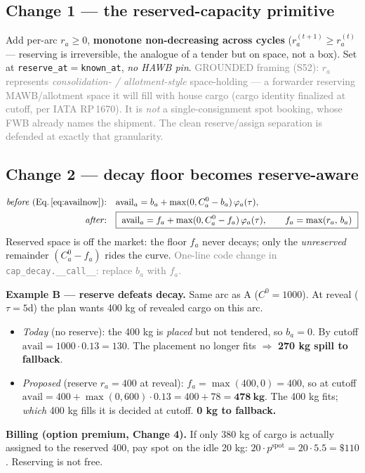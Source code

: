 \documentclass[11pt]{article}
\newcommand{\resv}{r}
\newcommand{\Cz}{C^{0}}
\newcommand{\avail}{\mathrm{avail}}
\newcommand{\code}[1]{\texttt{#1}}
\newcommand{\note}[1]{\textcolor{gray}{\small #1}}
\begin{document}
\subsection{Change 1 --- the reserved-capacity primitive}
Add per-arc $\resv_a\ge0$, \textbf{monotone non-decreasing across cycles}
($\resv_a^{(t+1)}\ge \resv_a^{(t)}$ --- reserving is irreversible, the analogue of a tender but on
space, not a box). Set at \code{reserve\_at}${}={}$\code{known\_at}, \emph{no HAWB pin}.
\note{GROUNDED framing (S52): $\resv_a$ represents \emph{consolidation- / allotment-style} space-holding
--- a forwarder reserving MAWB/allotment space it will fill with house cargo (cargo identity finalized at
cutoff, per IATA RP\,1670). It is \emph{not} a single-consignment spot booking, whose FWB already names
the shipment. The clean reserve/assign separation is defended at exactly that granularity.}

\subsection{Change 2 --- decay floor becomes reserve-aware}
\begin{align}
\text{\emph{before} (Eq.\,\ref{eq:availnow}):}\quad & \avail_a=b_a+\max(0,\Cz_a-b_a)\,\varphi_a(\tau),\\
\text{\emph{after}:}\quad & \boxed{\ \avail_a=f_a+\max(0,\Cz_a-f_a)\,\varphi_a(\tau),\qquad f_a=\max(\resv_a,\,b_a)\ }\label{eq:availnew}
\end{align}
Reserved space is off the market: the floor $f_a$ never decays; only the \emph{unreserved} remainder
$(\Cz_a-f_a)$ rides the curve. \note{One-line code change in \code{cap\_decay.\_\_call\_\_}: replace
$b_a$ with $f_a$.}

\begin{mdframed}[backgroundcolor=blue!4,linewidth=0.4pt]
\textbf{Example B --- reserve defeats decay.} Same arc as A ($\Cz=1000$). At reveal ($\tau=5$d) the plan
wants 400 kg of revealed cargo on this arc.
\begin{itemize}[leftmargin=1.4em,itemsep=0pt]
\item \emph{Today} (no reserve): the 400 kg is \emph{placed} but not tendered, so $b_a=0$. By cutoff
$\avail=1000\cdot0.13=130$. The placement no longer fits $\Rightarrow$ \textbf{270 kg spill to fallback}.
\item \emph{Proposed} (reserve $\resv_a=400$ at reveal): $f_a=\max(400,0)=400$, so at cutoff
$\avail=400+\max(0,600)\cdot0.13=400+78=\mathbf{478\ kg}$. The 400 kg fits; \emph{which} 400 kg fills it is
decided at cutoff. \textbf{0 kg to fallback.}
\end{itemize}
\textbf{Billing (option premium, Change 4).} If only 380 kg of cargo is actually assigned to the reserved
400, pay spot on the idle 20 kg: $20\cdot p^{\mathrm{spot}}=20\cdot5.5=\$110$. Reserving is not free.
\end{mdframed}
\end{document}
